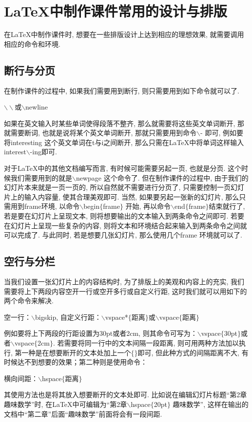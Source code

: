 \section{\LaTeX{}中制作课件常用的设计与排版}

在\LaTeX{}中制作课件时, 想要在一些排版设计上达到相应的理想效果, 就需要调用相应的命令和环境.
\subsection{断行与分页}

在制作课件的过程中, 如果我们需要用到断行, 则只需要用到如下命令就可以了.
\\ \centerline{
$\backslash\backslash$或$\backslash$newline}
如果在英文输入时某些单词使得段落不整齐, 那么就需要将这些英文单词断开, 那就需要断词, 也就是说将某个英文单词断开, 那就只需要用到命令$\backslash$- 即可, 例如要将interesting 这个英文单词在t与i之间断开, 那么只需在\LaTeX{}中将单词这样输入interest$\backslash$-ing即可.

对于\LaTeX{}中的其他文档编写而言, 有时候可能需要另起一页, 也就是分页. 这个时候我们需要用到的就是$\backslash$newpage 这个命令了. 但在制作课件的过程中, 由于我们的幻灯片本来就是一页一页的, 所以自然就不需要进行分页了, 只需要控制一页幻灯片上的输入内容量, 使其合理美观即可. 当然, 如果要另起一张新的幻灯片, 那么只需用到frame环境, 以命令$\backslash$begin$\{$frame$\}$ 开始, 再以命令$\backslash$end$\{$frame$\}$结束就行了, 若是要在幻灯片上呈现文本, 则将想要输出的文本输入到两条命令之间即可. 若要在幻灯片上呈现一些复杂的内容, 则将文本和环境结合起来输入到两条命令之间就可以完成了. 与此同时, 若是想要几张幻灯片, 那么使用几个frame 环境就可以了.
\subsection{空行与分栏}

当我们设置一张幻灯片上的内容结构时, 为了排版上的美观和内容上的充实, 我们需要将上下两段内容空开一行或空开多行或自定义行距, 这时我们就可以用如下的两个命令来解决.

\centerline{空一行：$\backslash$bigskip,\quad
自定义行距：$\backslash$vspace*$\{$距离$\}$或$\backslash$vspace$\{$距离$\}$}
例如要将上下两段的行距设置为30pt或者2cm, 则其命令可写为：$\backslash$vspace$\{$30pt$\}$或者$\backslash$vspace$\{$2cm$\}$.  若需要将同一行中的文本间隔一段距离, 则可用两种方法加以执行, 第一种是在想要断开的文本处加上一个$\{\}$即可, 但此种方式的间隔距离不大, 有时候达不到想要的效果；第二种则是使用命令：

\centerline{
横向间距：$\backslash$hspace$\{$距离$\}$}
其使用方法也是将其放入想要断开的文本处即可.  比如说在编辑幻灯片标题“第2章趣味数学”时, 在\LaTeX{}中可编辑为“第2章$\backslash$hspace$\{$20pt$\}$ 趣味数学”, 这样在输出的文档中“第二章”后面“趣味数学”前面将会有一段间距.


